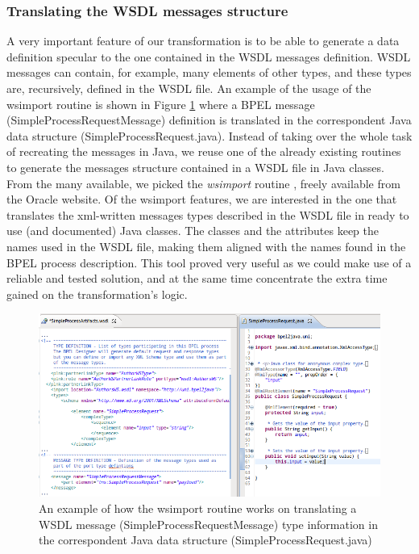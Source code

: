 \subsubsection{Translating the WSDL messages structure}
\label{sec:WSDLMEssagesStructure}
A very important feature of our transformation is to be able to generate a data definition specular to the one contained in the WSDL messages definition. WSDL messages can contain, for example, many elements of other types, and these types are, recursively, defined in the WSDL file. An example of the usage of the wsimport routine is shown in Figure \ref{fig:wsimport} where a BPEL message (SimpleProcessRequestMessage) definition is translated in the correspondent Java data structure (SimpleProcessRequest.java).
Instead of taking over the whole task of recreating the messages in Java, we reuse one of the already existing routines to generate the messages structure contained in a WSDL file in Java classes. From the many available, we picked the \textit{wsimport} routine \cite{wsimport}, freely available from the Oracle website. Of the wsimport features, we are interested in the one that translates the xml-written messages types described in the WSDL file in ready to use (and documented) Java classes. The classes and the attributes keep the names used in the WSDL file, making them aligned with the names found in the BPEL process description.
This tool proved very useful as we could make use of a reliable and tested solution, and at the same time concentrate the extra time gained on the transformation's logic. 

\begin{figure}
  \begin{center}
    \includegraphics[scale=0.57]{pictures/wsImport.png}
    \caption{An example of how the wsimport routine works on translating a WSDL message (SimpleProcessRequestMessage) type information in the correspondent Java data structure (SimpleProcessRequest.java)}
    \label{fig:wsimport}
  \end{center}
\end{figure} 

